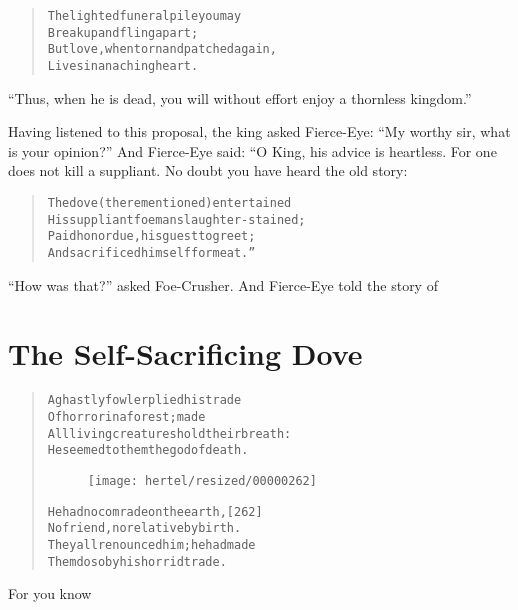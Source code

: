 \documentclass[article, twoside, 10pt]{memoir}
\renewenvironment{verbatim}{%
\begin{quote}%
\vskip -10pt%
\begin{alltt}\normalfont\small}{\end{alltt}%
\end{quote}%
\vskip -10pt
} %
\begin{document}
\begin{verbatim}
The lighted funeral pile you may
    Break up and fling apart;
But love, when torn and patched again,
    Lives in an aching heart.
\end{verbatim}
``Thus, when he is dead, you will without effort enjoy a thornless kingdom.''

Having listened to this proposal, the king asked Fierce-Eye:
``My worthy sir, what is your opinion?'' And Fierce-Eye said: “O
King, his advice is heartless. For one does not kill a suppliant.
No doubt you have heard the old story:

\begin{verbatim}
The dove (there mentioned) entertained
His suppliant foeman slaughter-stained;
Paid honor due, his guest to greet;
And sacrificed himself for meat.”
\end{verbatim}
``How was that?'' asked Foe-Crusher. And Fierce-Eye told the story
of

\chapter{The Self-Sacrificing Dove}

\begin{verbatim}
A ghastly fowler plied his trade
Of horror in a forest; made
All living creatures hold their breath:
He seemed to them the god of death.

\begin{figure}[p]\texttt{[image: hertel/resized/00000262]}\end{figure}He had no comrade on the earth,                         [262]
No friend, no relative by birth.
They all renounced him; he had made
Them do so by his horrid trade.
\end{verbatim}
For you know
\end{document}
